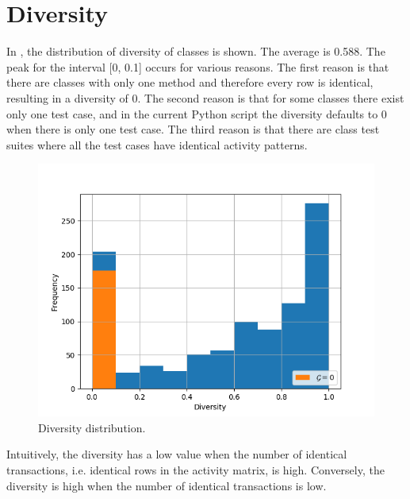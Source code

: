 \documentclass[twoside,a4paper,11pt]{memoir}
\begin{document}

\section{Diversity}
In , the distribution of diversity of classes is shown.
The average is 0.588.
The peak for the interval [0, 0.1] occurs for various reasons.
The first reason is that there are classes with only one method and therefore every row is identical, resulting in a diversity of 0.
The second reason is that for some classes there exist only one test case, and in the current Python script the diversity defaults to 0 when there is only one test case.
The third reason is that there are class test suites where all the test cases have identical activity patterns.

\begin{figure}
    \centering
    \includegraphics[width=\linewidth]{figures/histogram_diversity}
    \caption{Diversity distribution.}
    \label{fig:histogram_diversity}
\end{figure}

Intuitively, the diversity has a low value when the number of identical transactions, i.e. identical rows in the activity matrix, is high.
Conversely, the diversity is high when the number of identical transactions is low.
\end{document}
